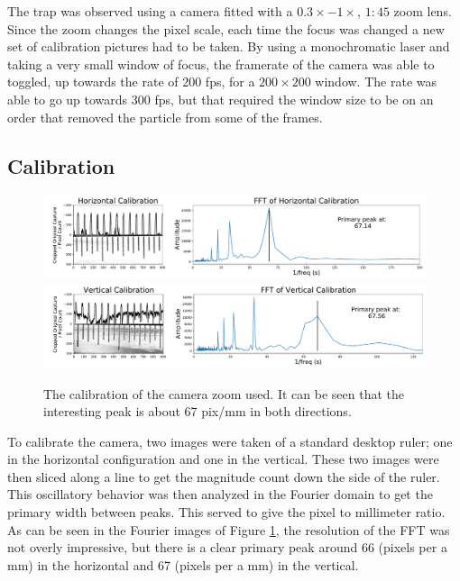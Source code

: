 \documentclass[12pt]{article}
\begin{document}
The trap was observed using a camera fitted with a $0.3\times - 1\times$, $1:45$ zoom lens. Since the zoom changes the pixel scale, each time the focus was changed a new set of calibration pictures had to be taken. By using a monochromatic laser and taking a very small window of focus, the framerate of the camera was able to toggled, up towards the rate of 200 fps, for a $200 \times 200$ window. The rate was able to go up towards 300 fps, but that required the window size to be on an order that removed the particle from some of the frames. 


\subsection{Calibration}
\begin{figure}[ht]
\centering
    \includegraphics[width=\textwidth]{hori_cali.pdf}
    \includegraphics[width=\textwidth]{vert_cali.pdf}
	\caption{The calibration of the camera zoom used. It can be seen that the interesting peak is about 67 pix/mm in both directions.}
    \label{fig:calibration}
\end{figure}
To calibrate the camera, two images were taken of a standard desktop ruler; one in the horizontal configuration and one in the vertical. These two images were then sliced along a line to get the magnitude count down the side of the ruler. This oscillatory behavior was then analyzed in the Fourier domain to get the primary width between peaks. This served to give the pixel to millimeter ratio. As can be seen in the Fourier images of Figure \ref{fig:calibration}, the resolution of the FFT was not overly impressive, but there is a clear primary peak around 66 (pixels per a mm) in the horizontal and 67 (pixels per a mm) in the vertical.
\end{document}
